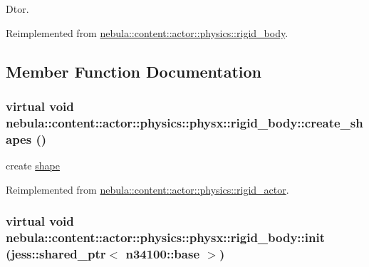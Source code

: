 Dtor. 

Reimplemented from \hyperlink{classnebula_1_1content_1_1actor_1_1physics_1_1rigid__body_a008df6b4e7d84d31372d4a5b35e4871e}{nebula::content::actor::physics::rigid\_\-body}.

\subsection{Member Function Documentation}
\hypertarget{classnebula_1_1content_1_1actor_1_1physics_1_1physx_1_1rigid__body_a15dd07c3ef17ca72b4bc7c8c9a3c0dd7}{
\subsubsection[{create\_\-shapes}]{\setlength{\rightskip}{0pt plus 5cm}virtual void nebula::content::actor::physics::physx::rigid\_\-body::create\_\-shapes ()}}
\label{classnebula_1_1content_1_1actor_1_1physics_1_1physx_1_1rigid__body_a15dd07c3ef17ca72b4bc7c8c9a3c0dd7}


create \hyperlink{namespacenebula_1_1content_1_1shape}{shape} 

Reimplemented from \hyperlink{classnebula_1_1content_1_1actor_1_1physics_1_1rigid__actor_a5ada308047050540ae655a7fe7ff8a3e}{nebula::content::actor::physics::rigid\_\-actor}.\hypertarget{classnebula_1_1content_1_1actor_1_1physics_1_1physx_1_1rigid__body_a737b1b04a6cdcbfed0643bf66f08aa84}{
\subsubsection[{init}]{\setlength{\rightskip}{0pt plus 5cm}virtual void nebula::content::actor::physics::physx::rigid\_\-body::init (jess::shared\_\-ptr$<$ {\bf n34100::base} $>$)}}
\label{classnebula_1_1content_1_1actor_1_1physics_1_1physx_1_1rigid__body_a737b1b04a6cdcbfed0643bf66f08aa84}


